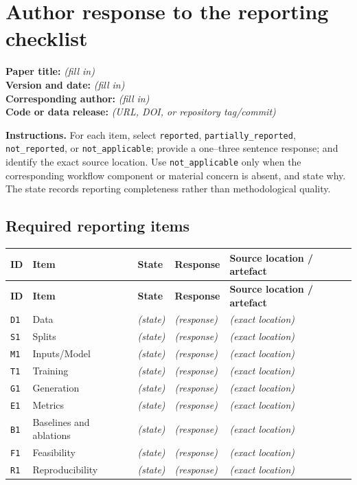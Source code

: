 \documentclass[10pt]{article}
\newcommand{\ResponseTableHeader}{%
\toprule
\textbf{ID} & \textbf{Item} & \textbf{State} & \textbf{Response} & \textbf{Source location / artefact}\\
\midrule}
\begin{document}
\section*{Author response to the reporting checklist}

\noindent\textbf{Paper title:} \emph{(fill in)}\\
\textbf{Version and date:} \emph{(fill in)}\\
\textbf{Corresponding author:} \emph{(fill in)}\\
\textbf{Code or data release:} \emph{(URL, DOI, or repository tag/commit)}

\medskip
\noindent\textbf{Instructions.} For each item, select \texttt{reported}, \texttt{partially\_reported}, \texttt{not\_reported}, or \texttt{not\_applicable}; provide a one--three sentence response; and identify the exact source location. Use \texttt{not\_applicable} only when the corresponding workflow component or material concern is absent, and state why. The state records reporting completeness rather than methodological quality.

\setlength{\LTpre}{4pt}
\setlength{\LTpost}{8pt}

\subsection*{Required reporting items}

\begin{longtable}{@{}L{0.05\textwidth} N{0.16\textwidth} L{0.14\textwidth} L{0.37\textwidth} L{0.20\textwidth}@{}}
\ResponseTableHeader
\endfirsthead
\ResponseTableHeader
\endhead
\bottomrule
\endfoot
\texttt{D1} & Data & \emph{(state)} & \emph{(response)} & \emph{(exact location)}\\
\texttt{S1} & Splits & \emph{(state)} & \emph{(response)} & \emph{(exact location)}\\
\texttt{M1} & Inputs/Model & \emph{(state)} & \emph{(response)} & \emph{(exact location)}\\
\texttt{T1} & Training & \emph{(state)} & \emph{(response)} & \emph{(exact location)}\\
\texttt{G1} & Generation & \emph{(state)} & \emph{(response)} & \emph{(exact location)}\\
\texttt{E1} & Metrics & \emph{(state)} & \emph{(response)} & \emph{(exact location)}\\
\texttt{B1} & Baselines and ablations & \emph{(state)} & \emph{(response)} & \emph{(exact location)}\\
\texttt{F1} & Feasibility & \emph{(state)} & \emph{(response)} & \emph{(exact location)}\\
\texttt{R1} & Reproducibility & \emph{(state)} & \emph{(response)} & \emph{(exact location)}\\
\end{longtable}
\end{document}

